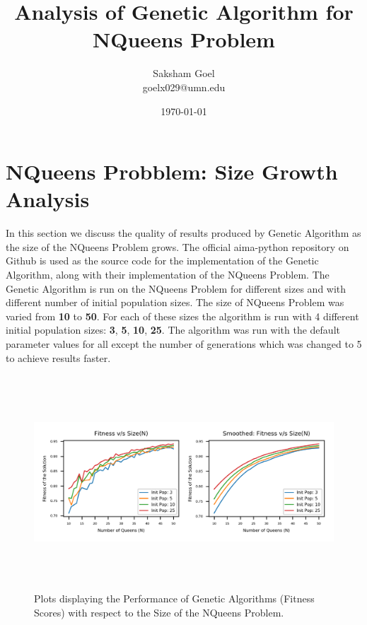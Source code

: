 \documentclass[11pt]{article}
\title{Analysis of Genetic Algorithm for NQueens Problem}
\author{
Saksham Goel\\goelx029@umn.edu
}
\date{\today}
\begin{document}
\maketitle

\section{NQueens Probblem: Size Growth Analysis}
\label{sec:fig}

In this section we discuss the quality of results produced by Genetic Algorithm as the size of the NQueens Problem grows. The official aima-python repository on Github is used as the source code for the implementation of the Genetic Algorithm, along with their implementation of the NQueens Problem. The Genetic Algorithm is run on the NQueens Problem for different sizes and with different number of initial population sizes. The size of NQueens Problem was varied from \textbf{10} to \textbf{50}. For each of these sizes the algorithm is run with 4 different initial population sizes: \textbf{3}, \textbf{5}, \textbf{10}, \textbf{25}.  The algorithm was run with the default parameter values for all except the number of generations which was changed to 5 to achieve results faster.


   \begin{figure}[h] %
      \centering
      \includegraphics[width=\textwidth,height=80mm,keepaspectratio]{../plots/Q1.png}
      \caption{Plots displaying the Performance of Genetic Algorithms (Fitness Scores) with respect to the Size of the NQueens Problem.}
      \label{fig:tabl}
   \end{figure}
\end{document}
